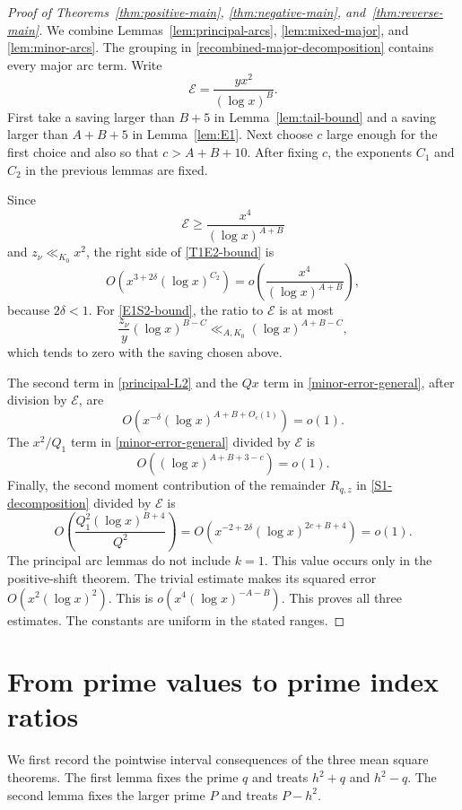 \documentclass[12pt,reqno]{amsart}
\numberwithin{equation}{section}
\theoremstyle{plain}
\theoremstyle{remark}
\begin{document}
\begin{proof}[Proof of Theorems~\ref{thm:positive-main},
\ref{thm:negative-main}, and~\ref{thm:reverse-main}]
We combine Lemmas~\ref{lem:principal-arcs}, \ref{lem:mixed-major}, and
\ref{lem:minor-arcs}.
The grouping in \eqref{recombined-major-decomposition} contains every major arc term.
Write
\[
 \mathcal E=\frac{yx^2}{(\log x)^B}.
\]
First take a saving larger than $B+5$ in
Lemma~\ref{lem:tail-bound} and a saving larger than $A+B+5$ in
Lemma~\ref{lem:E1}.
Next choose $c$ large enough for the first choice and also so that
$c>A+B+10$.
After fixing $c$, the exponents $C_1$ and $C_2$ in the previous lemmas are fixed.

Since
\[
 \mathcal E
 \geq\frac{x^4}{(\log x)^{A+B}}
\]
and $z_\nu\ll_{K_0}x^2$, the right side of
\eqref{T1E2-bound} is
\[
 O\left(x^{3+2\delta}(\log x)^{C_2}\right)
 =o\left(\frac{x^4}{(\log x)^{A+B}}\right),
\]
because $2\delta<1$.
For \eqref{E1S2-bound}, the ratio to $\mathcal E$ is at most
\[
 \frac{z_\nu}{y}(\log x)^{B-C}
 \ll_{A,K_0}(\log x)^{A+B-C},
\]
which tends to zero with the saving chosen above.

The second term in \eqref{principal-L2} and the $Qx$ term in
\eqref{minor-error-general}, after division by $\mathcal E$, are
\[
 O\left(x^{-\delta}(\log x)^{A+B+O_c(1)}\right)=o(1).
\]
The $x^2/Q_1$ term in \eqref{minor-error-general} divided by
$\mathcal E$ is
\[
 O\left((\log x)^{A+B+3-c}\right)=o(1).
\]
Finally, the second moment contribution of the remainder $R_{q,z}$ in \eqref{S1-decomposition} divided by
$\mathcal E$ is
\[
 O\left(\frac{Q_1^2(\log x)^{B+4}}{Q^2}\right)
 =O\left(x^{-2+2\delta}(\log x)^{2c+B+4}\right)=o(1).
\]
The principal arc lemmas do not include $k=1$.
This value occurs only in the positive-shift theorem.
The trivial estimate makes its squared error $O(x^2(\log x)^2)$.
This is $o(x^4(\log x)^{-A-B})$.
This proves all three estimates.
The constants are uniform in the stated ranges.
\end{proof}
\section{From prime values to prime index ratios}\label{sec:counting}

We first record the pointwise interval consequences of the three mean
square theorems.  The first lemma fixes the prime $q$ and treats
$h^2+q$ and $h^2-q$.  The second lemma fixes the larger prime $P$ and
treats $P-h^2$.
\end{document}
